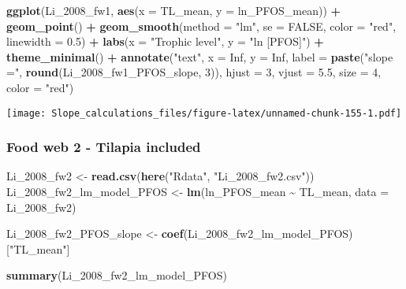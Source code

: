 \documentclass[
]{article}
\newenvironment{Shaded}{\begin{snugshade}}{\end{snugshade}}
\newcommand{\AttributeTok}[1]{\textcolor[rgb]{0.13,0.29,0.53}{#1}}
\newcommand{\ConstantTok}[1]{\textcolor[rgb]{0.56,0.35,0.01}{#1}}
\newcommand{\DecValTok}[1]{\textcolor[rgb]{0.00,0.00,0.81}{#1}}
\newcommand{\FloatTok}[1]{\textcolor[rgb]{0.00,0.00,0.81}{#1}}
\newcommand{\FunctionTok}[1]{\textcolor[rgb]{0.13,0.29,0.53}{\textbf{#1}}}
\newcommand{\NormalTok}[1]{#1}
\newcommand{\OtherTok}[1]{\textcolor[rgb]{0.56,0.35,0.01}{#1}}
\newcommand{\SpecialCharTok}[1]{\textcolor[rgb]{0.81,0.36,0.00}{\textbf{#1}}}
\newcommand{\StringTok}[1]{\textcolor[rgb]{0.31,0.60,0.02}{#1}}
\begin{document}
\begin{Shaded}
\begin{Highlighting}[]
\FunctionTok{ggplot}\NormalTok{(Li\_2008\_fw1, }\FunctionTok{aes}\NormalTok{(}\AttributeTok{x =}\NormalTok{ TL\_mean, }\AttributeTok{y =}\NormalTok{ ln\_PFOS\_mean)) }\SpecialCharTok{+}
  \FunctionTok{geom\_point}\NormalTok{() }\SpecialCharTok{+}
  \FunctionTok{geom\_smooth}\NormalTok{(}\AttributeTok{method =} \StringTok{"lm"}\NormalTok{, }\AttributeTok{se =} \ConstantTok{FALSE}\NormalTok{, }\AttributeTok{color =} \StringTok{"red"}\NormalTok{, }\AttributeTok{linewidth =} \FloatTok{0.5}\NormalTok{) }\SpecialCharTok{+}
  \FunctionTok{labs}\NormalTok{(}\AttributeTok{x =} \StringTok{"Trophic level"}\NormalTok{,}
       \AttributeTok{y =} \StringTok{"ln [PFOS]"}\NormalTok{) }\SpecialCharTok{+}
  \FunctionTok{theme\_minimal}\NormalTok{() }\SpecialCharTok{+}
  \FunctionTok{annotate}\NormalTok{(}\StringTok{"text"}\NormalTok{, }\AttributeTok{x =} \ConstantTok{Inf}\NormalTok{, }\AttributeTok{y =} \ConstantTok{Inf}\NormalTok{, }\AttributeTok{label =} \FunctionTok{paste}\NormalTok{(}\StringTok{"slope ="}\NormalTok{, }\FunctionTok{round}\NormalTok{(Li\_2008\_fw1\_PFOS\_slope, }\DecValTok{3}\NormalTok{)), }
           \AttributeTok{hjust =} \DecValTok{3}\NormalTok{, }\AttributeTok{vjust =} \FloatTok{5.5}\NormalTok{, }\AttributeTok{size =} \DecValTok{4}\NormalTok{, }\AttributeTok{color =} \StringTok{"red"}\NormalTok{)}
\end{Highlighting}
\end{Shaded}

\texttt{[image: Slope\_calculations\_files/figure-latex/unnamed-chunk-155-1.pdf]}

\subsubsection{Food web 2 - Tilapia
included}\label{food-web-2---tilapia-included}

\begin{Shaded}
\begin{Highlighting}[]
\NormalTok{Li\_2008\_fw2 }\OtherTok{\textless{}{-}} \FunctionTok{read.csv}\NormalTok{(}\FunctionTok{here}\NormalTok{(}\StringTok{"Rdata"}\NormalTok{, }\StringTok{"Li\_2008\_fw2.csv"}\NormalTok{))}
\NormalTok{Li\_2008\_fw2\_lm\_model\_PFOS }\OtherTok{\textless{}{-}} \FunctionTok{lm}\NormalTok{(ln\_PFOS\_mean }\SpecialCharTok{\textasciitilde{}}\NormalTok{ TL\_mean,}
                                \AttributeTok{data =}\NormalTok{ Li\_2008\_fw2)}

\NormalTok{Li\_2008\_fw2\_PFOS\_slope }\OtherTok{\textless{}{-}} \FunctionTok{coef}\NormalTok{(Li\_2008\_fw2\_lm\_model\_PFOS)[}\StringTok{"TL\_mean"}\NormalTok{]}

\FunctionTok{summary}\NormalTok{(Li\_2008\_fw2\_lm\_model\_PFOS)}
\end{Highlighting}
\end{Shaded}
\end{document}
